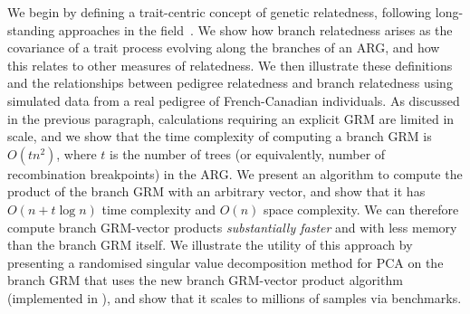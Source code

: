 We begin by defining a trait-centric concept of genetic relatedness, following
long-standing approaches in the 
field~\citep{fisher1919correlation, wright1922coefficients}. 
We show how branch relatedness arises as the
covariance of a trait process evolving along the branches of an ARG, and how
this relates to other measures of relatedness.
We then illustrate these definitions and the relationships between pedigree
relatedness and branch relatedness using simulated data from a real pedigree of
French-Canadian individuals. 
As discussed in the previous paragraph, calculations requiring an explicit 
GRM are limited in scale, and we show that the time complexity of 
computing a branch GRM is 
$O(t n^2)$, where $t$ is the number of trees (or equivalently, number 
of recombination breakpoints) in the ARG.
We present an algorithm to compute the product of the branch GRM with
an arbitrary vector, and show that it has 
$O(n + t \log{n})$ time complexity and $O(n)$ space complexity.
We can therefore compute branch GRM-vector products 
\emph{substantially faster} and with less memory 
than the branch GRM itself.
We illustrate the utility of this approach by presenting a
randomised singular value decomposition method 
for PCA on the branch GRM that
uses the new branch GRM-vector product algorithm (implemented 
in \tskit{}), and show that it scales to millions of samples
via benchmarks.
